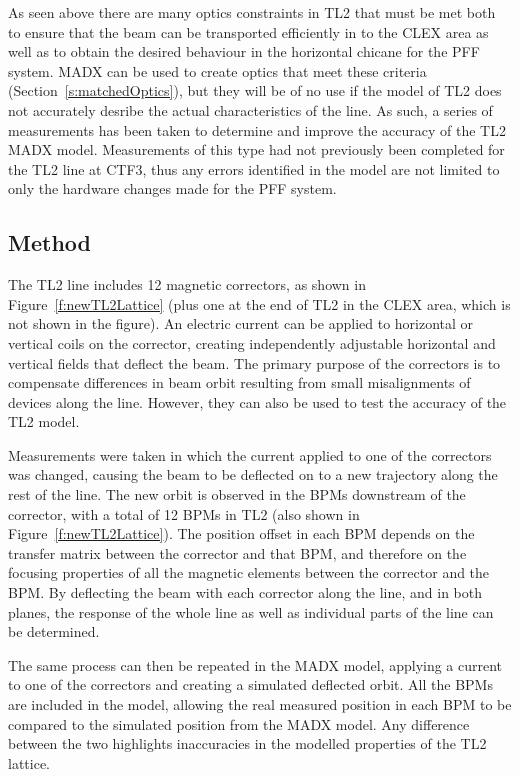 
As seen above there are many optics constraints in TL2 that must be met both to ensure that the beam can be transported efficiently in to the CLEX area as well as to obtain the desired behaviour in the horizontal chicane for the PFF system. MADX can be used to create optics that meet these criteria (Section~\ref{s:matchedOptics}), but they will be of no use if the model of TL2 does not accurately desribe the actual characteristics of the line. As such, a series of measurements has been taken to determine and improve the accuracy of the TL2 MADX model. Measurements of this type had not previously been completed for the TL2 line at CTF3, thus any errors identified in the model are not limited to only the hardware changes made for the PFF system.

\subsection{Method}
\label{ss:opticsMethod}

The TL2 line includes 12 magnetic correctors, as shown in Figure~\ref{f:newTL2Lattice} (plus one at the end of TL2 in the CLEX area, which is not shown in the figure). An electric current can be applied to horizontal or vertical coils on the corrector, creating independently adjustable horizontal and vertical fields that deflect the beam. The primary purpose of the correctors is to compensate differences in beam orbit resulting from small misalignments of devices along the line. However, they can also be used to test the accuracy of the TL2 model.

Measurements were taken in which the current applied to one of the correctors was changed, causing the beam to be deflected on to a new trajectory along the rest of the line. The new orbit is observed in the BPMs downstream of the corrector, with a total of 12 BPMs in TL2 (also shown in Figure~\ref{f:newTL2Lattice}). The position offset in each BPM depends on the transfer matrix between the corrector and that BPM, and therefore on the focusing properties of all the magnetic elements between the corrector and the BPM. By deflecting the beam with each corrector along the line, and in both planes, the response of the whole line as well as individual parts of the line can be determined.

The same process can then be repeated in the MADX model, applying a current to one of the correctors and creating a simulated deflected orbit. All the BPMs are included in the model, allowing the real measured position in each BPM to be compared to the simulated position from the MADX model. Any difference between the two highlights inaccuracies in the modelled properties of the TL2 lattice.

